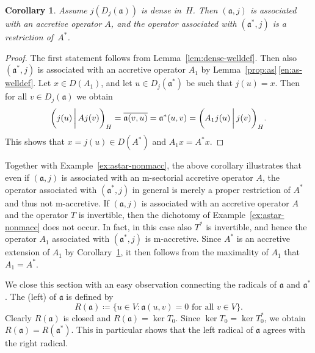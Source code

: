 \documentclass[a4paper,oneside,12pt]{amsart}
\theoremstyle{plain}
\newtheorem{corollary}[theorem]{Corollary}
\theoremstyle{definition}
\begin{document}
\begin{corollary}
\label{cor:as-restrict} 
Assume $j(D_j({{\mathfrak{{a}}}}))$ is dense in~$H$. Then $({{\mathfrak{{a}}}},j)$ is associated with an accretive operator $A$,
and the operator associated with $({{\mathfrak{{a}}}}^*,j)$ is a restriction of~$A^*$.
\end{corollary}
\begin{proof}
The first statement follows from Lemma~\ref{lem:dense-welldef}.
Then also $({{\mathfrak{{a}}}}^*,j)$ is associated with an accretive operator $A_1$ by Lemma~\ref{prop:as}\,\ref{en:as-welldef}.
Let $x\in D(A_1)$, and let $u\in D_j({{\mathfrak{{a}}}}^*)$ be such that $j(u)=x$.
Then for all $v\in D_j({{\mathfrak{{a}}}})$ we obtain
\[
    {{\ifthenelse{\equal{auto}{auto}}{\left({j(u)}\mkern3mu{\biggm|}\mkern3mu {Aj(v)}\right)}{}
\ifthenelse{\equal{auto}{b}}{\bigl({j(u)}\mkern3mu{\biggm|}\mkern3mu {Aj(v)}\bigr)}{}
\ifthenelse{\equal{auto}{B}}{\Bigl({j(u)}\mkern3mu{\bigm|}\mkern3mu {Aj(v)}\Bigr)}{}
}}_H = {\overline{{{{\mathfrak{{a}}}}(v,u)}}} = {{\mathfrak{{a}}}}^*(u,v) = {{\ifthenelse{\equal{auto}{auto}}{\left({A_1 j(u)}\mkern3mu{\biggm|}\mkern3mu {j(v)}\right)}{}
\ifthenelse{\equal{auto}{b}}{\bigl({A_1 j(u)}\mkern3mu{\biggm|}\mkern3mu {j(v)}\bigr)}{}
\ifthenelse{\equal{auto}{B}}{\Bigl({A_1 j(u)}\mkern3mu{\bigm|}\mkern3mu {j(v)}\Bigr)}{}
}}_H.
\]
This shows that $x=j(u)\in D(A^*)$ and $A_1x=A^*x$.
\end{proof}

Together with Example~\ref{ex:astar-nonmacc}, the above corollary illustrates that even if $({{\mathfrak{{a}}}},j)$ is associated with an {\ensuremath{\text{m}}}-sectorial accretive operator $A$,
the operator associated with $({{\mathfrak{{a}}}}^*,j)$ in general is merely a proper restriction of $A^*$ and thus not {\ensuremath{\text{m}}}-accretive.
If $({{\mathfrak{{a}}}},j)$ is associated with an accretive operator $A$ and the operator $T$ is invertible, then the dichotomy of Example~\ref{ex:astar-nonmacc} does not occur.
In fact, in this case also $T^*$ is invertible, and hence the operator $A_1$ associated with $({{\mathfrak{{a}}}}^*,j)$ is {\ensuremath{\text{m}}}-accretive.
Since $A^*$ is an accretive extension of $A_1$ by Corollary~\ref{cor:as-restrict}, 
it then follows from the maximality of $A_1$ that $A_1=A^*$.

We close this section with an easy observation connecting the radicals of ${{\mathfrak{{a}}}}$ and ${{\mathfrak{{a}}}}^*$. The (left) {\textbf{\unboldmath}} of ${{\mathfrak{{a}}}}$ is defined by
\[
    R({{\mathfrak{{a}}}})\coloneqq\{u\in V: {{\mathfrak{{a}}}}(u,v)=0\text{ for all $v\in V$}\}.
\] 
Clearly $R({{\mathfrak{{a}}}})$ is closed and $R({{\mathfrak{{a}}}})=\ker T_0$. Since $\ker T_0=\ker T_0^*$, we obtain $R({{\mathfrak{{a}}}})=R({{\mathfrak{{a}}}}^*)$.
This in particular shows that the left radical of ${{\mathfrak{{a}}}}$ agrees with the right radical.
\end{document}
